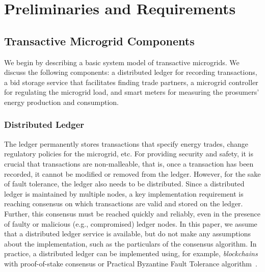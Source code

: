 \section{Preliminaries and Requirements}

\subsection{Transactive Microgrid Components}

We begin by describing a basic system model of transactive microgrids.
We discuss the following components: a distributed ledger for recording transactions, a bid storage service that facilitates finding trade partners, a microgrid controller for regulating the microgrid load, and smart meters for measuring the prosumers' energy production and consumption.

\subsubsection{Distributed Ledger}
The ledger permanently stores transactions that specify energy trades, change regulatory policies for the microgrid, etc.
For providing security and safety, it is crucial that transactions are non-malleable, that is, once a transaction has been recorded, it cannot be modified or removed from the ledger.
However, for the sake of fault tolerance, the ledger also needs to be distributed.
Since a distributed ledger is maintained by multiple nodes, a key implementation requirement is reaching consensus on which transactions are valid and stored on the ledger.
Further, this consensus must be reached quickly and reliably, even in the presence of faulty or malicious (e.g., compromised) ledger nodes.
In this paper, we assume that a distributed ledger service is available, but do not make any assumptions about the implementation, such as the particulars of the consensus algorithm.
In practice, a distributed ledger can be implemented using, for example, \emph{blockchains} with proof-of-stake consensus or Practical Byzantine Fault Tolerance algorithm~\cite{castro1999practical}.

